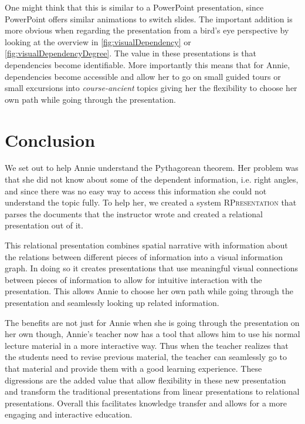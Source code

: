 \documentclass{llncs}
\newcommand{\sys}{\textsc{RPresentation}\xspace}
\begin{document}
One might think that this is similar to a PowerPoint presentation, since PowerPoint offers
similar animations to switch slides. The important addition is more obvious when regarding
the presentation from a bird's eye perspective by looking at the overview in
\autoref{fig:visualDependency} or \autoref{fig:visualDependencyDegree}. The value in these
presentations is that dependencies become identifiable. More importantly this means that
for Annie, dependencies become accessible and allow her to go on small guided tours or
small excursions into \textit{course-ancient} topics giving her the flexibility to choose
her own path while going through the presentation.

\section{Conclusion}
\label{sec:conclusion}

We set out to help Annie understand the Pythagorean theorem. Her problem was that she did not know about some of the dependent information, i.e. right angles, and since there was no easy way to access this information she could not understand the topic fully. To help her, we created a system \sys that parses the documents that the instructor wrote and created a relational presentation out of it.

This relational presentation combines spatial narrative with information about the relations between different pieces of information into a visual information graph. In doing so it creates presentations that use meaningful visual connections between pieces of information to allow for intuitive interaction with the presentation. This allows Annie to choose her own path while going through the presentation and seamlessly looking up related information.

The benefits are not just for Annie when she is going through the presentation on her own though, Annie's teacher now has a tool that allows him to use his normal lecture material in a more interactive way. Thus when the teacher realizes that the students need to revise previous material, the teacher can seamlessly go to that material and provide them with a good learning experience. These digressions are the added value that allow flexibility in these new presentation and transform the traditional presentations from linear presentations to relational presentations. Overall this facilitates knowledge transfer and allows for a more engaging and interactive education.
\end{document}

